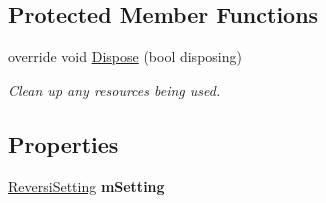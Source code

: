 \subsection*{Protected Member Functions}
\begin{DoxyCompactItemize}
\item 
override void \hyperlink{class_reversi_form_1_1_setting_form_ab4be09946d93ed193820f8d7acfc2cb5}{Dispose} (bool disposing)
\begin{DoxyCompactList}\small\item\em Clean up any resources being used. \end{DoxyCompactList}\end{DoxyCompactItemize}
\subsection*{Properties}
\begin{DoxyCompactItemize}
\item 
\mbox{\label{class_reversi_form_1_1_setting_form_a46fa25adbb985dc6e258bbd7450d8064}} 
\hyperlink{class_reversi_form_1_1_reversi_setting}{Reversi\+Setting} {\bfseries m\+Setting}
\end{DoxyCompactItemize}
